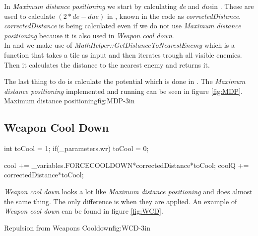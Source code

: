 	In \textit{Maximum distance positioning} we start by calculating \textit{de} and \textit{due}in  . These are used to calculate $(2*de - due)$ in , known in the code as \textit{correctedDistance}. \\
	
	\textit{correctedDistance} is being calculated even if we do not use \textit{Maximum distance positioning} because it is also used in \textit{Weapon cool down}. \\
	
	In  and  we make use of \textit{MathHelper::GetDistanceToNearestEnemy} which is a function that takes a tile as input and then iterates trough all visible enemies. Then it calculates the distance to the nearest enemy and returns it.
	
	The last thing to do is calculate the potential which is done in . The \textit{Maximum distance positioning} implemented and running can be seen in figure \ref{fig:MDP}. \\

	
			{Maximum distance positioning}{fig:MDP}{-3in}

	\subsection{Weapon Cool Down}
		\begin{Sourcecode}[caption=Weapon cool down]
int toCool = 1;
if(_parameters.wr)
	toCool = 0;
	
cool += _variables.FORCECOOLDOWN*correctedDistance*toCool;
coolQ += correctedDistance*toCool;
\end{Sourcecode}	
	\textit{Weapon cool down} looks a lot like \textit{Maximum distance positioning} and does almost the same thing. The only difference is when they are applied. An example of \textit{Weapon cool down} can be found in figure \ref{fig:WCD}.
	
		{Repulsion from Weapons Cooldown}{fig:WCD}{-3in}

